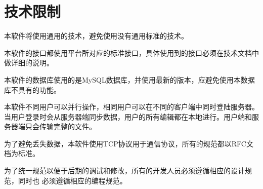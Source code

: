 \section{技术限制}
\item 本软件将使用通用的技术，避免使用没有通用标准的技术。
\item 本软件的接口都使用平台所对应的标准接口，具体使用到的接口必须在技术文档中做详细的说明。
\item 本软件的数据库使用的是MySQL数据库，并使用最新的版本，应避免使用本数据库不具有的功能。
\item 本软件不同用户可以并行操作，相同用户可以在不同的客户端中同时登陆服务器。当用户登录时会从服务器端同步数据，用户的所有编辑都在本地进行。用户端和服务器端只会传输完整的文件。
\item 为了避免丢失数据，本软件使用TCP协议用于通信协议，所有的规范都以RFC文档为标准。
\item 为了统一规范以便于后期的调试和修改，所有的开发人员必须遵循相应的设计规范，同时也 必须遵循相应的编程规范。
